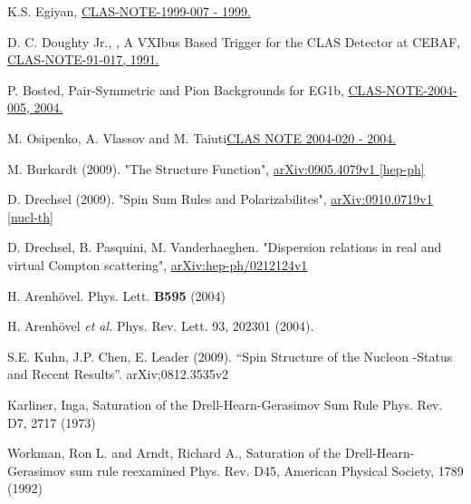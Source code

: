  K.S. Egiyan, \href{http://www.jlab.org/Hall-B/notes/clas_notes99/ec_thresh.ps}{CLAS-NOTE-1999-007 - 1999.}


 D. C. Doughty Jr., \etal, A VXIbus Based Trigger for the CLAS Detector at CEBAF,            \href{http://wwwold.jlab.org/Hall-B/notes/clas\_notes91/note91-017.pdf}{CLAS-NOTE-91-017, 1991.}

 P. Bosted, Pair-Symmetric and Pion Backgrounds for EG1b, \href{http://www.jlab.org/Hall-B/notes/clas\_notes04/2004-005.ps}{CLAS-NOTE-2004-005, 2004.}

 M. Osipenko, A. Vlassov and M. Taiuti\href{http://www.jlab.org/Hall-B/notes/clas_notes04/2004-020.pdf}{CLAS NOTE 2004-020 - 2004.}



 M. Burkardt (2009). "The \gtwo Structure Function", \href{http://arxiv.org/abs/0905.4079}{arXiv:0905.4079v1 [hep-ph]}

 D. Drechsel (2009). "Spin Sum Rules and Polarizabilites", \href{http://arxiv.org/abs/0910.0719}{arXiv:0910.0719v1 [nucl-th]}

 D. Drechsel, B. Pasquini, M. Vanderhaeghen. "Dispersion relations in real and virtual Compton scattering", \href{http://arxiv.org/abs/hep-ph/0212124}{arXiv:hep-ph/0212124v1}

 H. Arenhövel. Phys. Lett. \textbf{B595} (2004) 

 H. Arenhövel {\em et al.} Phys. Rev. Lett. 93, 202301 (2004).

 S.E. Kuhn, J.P. Chen, E. Leader (2009). ``Spin Structure of the Nucleon -Status and Recent Results''. arXiv;0812.3535v2

        Karliner, Inga, Saturation of the Drell-Hearn-Gerasimov Sum Rule
        Phys. Rev. D7, 2717 (1973)

         Workman, Ron L. and Arndt, Richard A., Saturation of the Drell-Hearn-Gerasimov sum rule reexamined
         Phys. Rev. D45, American Physical Society, 1789 (1992)

